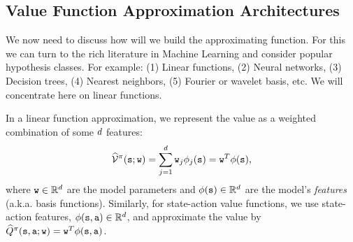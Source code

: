 
\subsection{Value Function Approximation Architectures}

We now need to discuss how will we build the approximating function.
For this we can turn to the rich literature in Machine Learning and
consider popular hypothesis classes. For example: (1) Linear
functions, (2) Neural networks, (3) Decision trees, (4) Nearest
neighbors, (5) Fourier or wavelet basis, etc. We will concentrate
here on linear functions.

In a linear function approximation, we represent the value as a weighted combination of some $d$ features:
$$\widehat{\mathcal{V}}^\pi({\tt s};{\tt w}) = \sum_{j=1}^d {\tt w}_j \phi_j({\tt s}) = {\tt w}^T \phi({\tt s}),$$
where ${\tt w} \in \mathbb{R}^d$ are the model parameters and $\phi({\tt s}) \in \mathbb{R}^d$ are the model's \emph{features} (a.k.a. basis functions). Similarly, for state-action value functions, we use state-action features, $\phi({\tt s},{\tt a})\in \mathbb{R}^d$, and approximate the value by $\widehat{Q}^\pi({\tt s},{\tt a};{\tt w}) =  {\tt w}^T \phi({\tt s},{\tt a})$.

